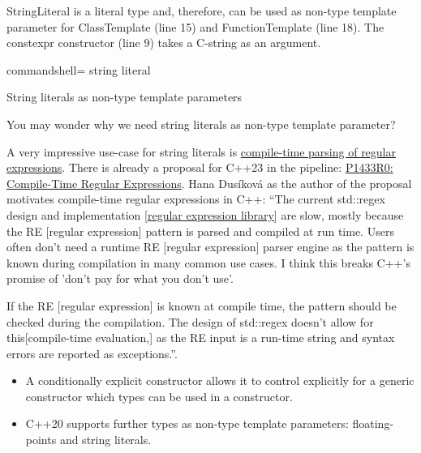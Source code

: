 StringLiteral is a literal type and, therefore, can be used as non-type template parameter for ClassTemplate (line 15) and FunctionTemplate (line 18). The constexpr constructor (line 9) takes a C-string as an argument.

\begin{tcblisting}{commandshell={}}
string literal
\end{tcblisting}

\begin{center}
String literals as non-type template parameters
\end{center}

You may wonder why we need string literals as non-type template parameter?

\begin{tcolorbox}[colback=mygreen!5!white,colframe=mygreen!75!black,title={Compile-Time Regular Expressions}]

A very impressive use-case for string literals is \href{https://github.com/hanickadot/compile-time-regular-expressions}{compile-time parsing of regular expressions}. There is already a proposal for C++23 in the pipeline: \href{http://www.open-std.org/jtc1/sc22/wg21/docs/papers/2019/p1433r0.pdf}{P1433R0: Compile-Time Regular Expressions}. Hana Dusíková as the author of the proposal motivates compile-time regular expressions in C++: “The current std::regex design and implementation [\href{https://en.cppreference.com/w/cpp/regex}{regular expression library}] are slow, mostly because the RE [regular expression] pattern is parsed and compiled at run time. Users often don’t need a runtime RE [regular expression] parser engine as the pattern is known during compilation in many common use cases. I think this breaks C++’s promise of ’don’t pay for what you don’t use’.

If the RE [regular expression] is known at compile time, the pattern should be checked during the compilation. The design of std::regex doesn’t allow for this[compile-time evaluation,] as the RE input is a run-time string and syntax errors are reported as exceptions.”.

\end{tcolorbox}

\begin{tcolorbox}[colback=blue!5!white,colframe=blue!75!black,title={Distilled Information}]
\begin{itemize}
\item 
A conditionally explicit constructor allows it to control explicitly for a generic constructor which types can be used in a constructor.

\item 
C++20 supports further types as non-type template parameters: floating-points and string literals.
\end{itemize}
\end{tcolorbox}